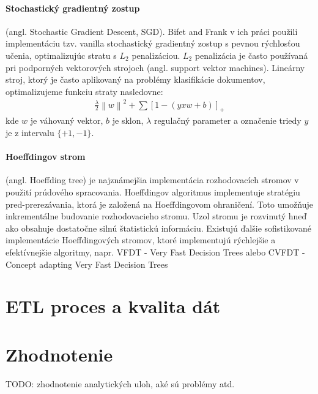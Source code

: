 \paragraph{Stochastický gradientný zostup} (angl. Stochastic Gradient Descent, SGD). Bifet and Frank v ich práci použili implementáciu tzv. vanilla stochastický gradientný zostup s pevnou rýchlosťou učenia, optimalizujúc stratu s $L_2$ penalizáciou. $L_2$ penalizácia je často používaná pri podporných vektorových strojoch (angl. support vektor machines). Lineárny stroj, ktorý je často aplikovaný na problémy klasifikácie dokumentov, optimalizujeme funkciu straty nasledovne:
\begin{align*}
\frac{\lambda }{2}\left \| w \right \|^{2}+\sum [1-(yxw + b)]_{+}
\end{align*}
kde $w$ je váhovaný vektor, $b$ je sklon, $\lambda$ regulačný parameter a označenie triedy $y$ je z intervalu $\{+1, -1\}$.

\paragraph{Hoeffdingov strom} (angl. Hoeffding tree) je najznámejšia implementácia rozhodovacích stromov v použití prúdového spracovania. Hoeffdingov algoritmus implementuje stratégiu pred-prerezávania, ktorá je založená na Hoeffdingovom ohraničení. Toto umožňuje inkrementálne budovanie rozhodovacieho stromu. Uzol stromu je rozvinutý hneď ako obsahuje dostatočne silnú štatistickú informáciu. Existujú ďalšie sofistikované implementácie Hoeffdingových stromov, ktoré implementujú rýchlejšie a efektívnejšie algoritmy, napr. VFDT - Very Fast Decision Trees \citep{domingos2000mining} alebo CVFDT - Concept adapting Very Fast Decision Trees \citep{hulten2001mining}

\section{ETL proces a kvalita dát}


\section{Zhodnotenie}
TODO: zhodnotenie analytických uloh, aké sú problémy atd.